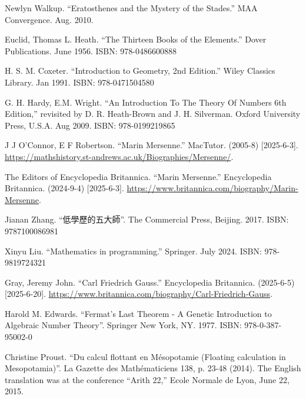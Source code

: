Newlyn Walkup. ``Eratosthenes and the Mystery of the Stades.'' MAA Convergence. Aug. 2010.

Euclid, Thomas L. Heath. ``The Thirteen Books of the Elements.'' Dover Publications. June 1956. ISBN: 978-0486600888

H. S. M. Coxeter. ``Introduction to Geometry, 2nd Edition.'' Wiley Classics Library. Jan 1991. ISBN: 978-0471504580

G. H. Hardy, E.M. Wright. ``An Introduction To The Theory Of Numbers 6th Edition,'' revisited by D. R. Heath-Brown and J. H. Silverman. Oxford University Press, U.S.A. Aug 2009. ISBN: 978-0199219865

J J O'Connor, E F Robertson. ``Marin Mersenne.'' MacTutor. (2005-8) [2025-6-3]. \url{https://mathshistory.st-andrews.ac.uk/Biographies/Mersenne/}.

The Editors of Encyclopedia Britannica. ``Marin Mersenne.'' Encyclopedia Britannica. (2024-9-4) [2025-6-3]. \url{https://www.britannica.com/biography/Marin-Mersenne}.

Jianan Zhang. ``低學歷的五大師''. The Commercial Press, Beijing. 2017. ISBN: 9787100086981

Xinyu Liu. ``Mathematics in programming.'' Springer. July 2024. ISBN: 978-9819724321

Gray, Jeremy John. ``Carl Friedrich Gauss.'' Encyclopedia Britannica. (2025-6-5) [2025-6-20]. \url{https://www.britannica.com/biography/Carl-Friedrich-Gauss}.

Harold M. Edwards. ``Fermat's Last Theorem - A Genetic Introduction to Algebraic Number Theory''. Springer New York, NY. 1977. ISBN: 978-0-387-95002-0

Christine Proust. ``Du calcul flottant en Mésopotamie (Floating calculation in Mesopotamia)''. La Gazette des Mathématiciens 138, p. 23-48 (2014). The English translation was at the conference ``Arith 22,''  Ecole Normale de Lyon, June 22, 2015.


